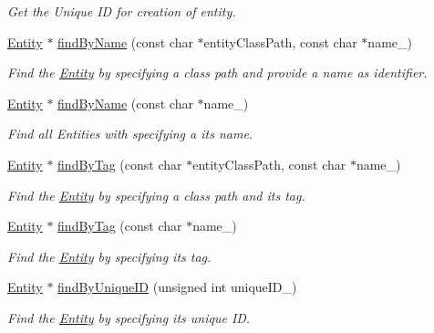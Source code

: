 \begin{DoxyCompactItemize}
\begin{DoxyCompactList}\small\item\em Get the Unique ID for creation of entity. \end{DoxyCompactList}\item 
\hyperlink{class_magnum_1_1_entity}{Entity} $\ast$ \hyperlink{class_magnum_1_1_entity_1_1_factory_a4fa2251befd88022de0971ba69566185}{find\+By\+Name} (const char $\ast$entity\+Class\+Path, const char $\ast$name\+\_\+)
\begin{DoxyCompactList}\small\item\em Find the \hyperlink{class_magnum_1_1_entity}{Entity} by specifying a class path and provide a name as identifier. \end{DoxyCompactList}\item 
\hyperlink{class_magnum_1_1_entity}{Entity} $\ast$ \hyperlink{class_magnum_1_1_entity_1_1_factory_a7b67defc2c3bd986ac0a56687c2ab934}{find\+By\+Name} (const char $\ast$name\+\_\+)
\begin{DoxyCompactList}\small\item\em Find all Entities with specifying a its name. \end{DoxyCompactList}\item 
\hyperlink{class_magnum_1_1_entity}{Entity} $\ast$ \hyperlink{class_magnum_1_1_entity_1_1_factory_a473713fa8f8d064bf8daa9be8b8fd7d3}{find\+By\+Tag} (const char $\ast$entity\+Class\+Path, const char $\ast$name\+\_\+)
\begin{DoxyCompactList}\small\item\em Find the \hyperlink{class_magnum_1_1_entity}{Entity} by specifying a class path and its tag. \end{DoxyCompactList}\item 
\hyperlink{class_magnum_1_1_entity}{Entity} $\ast$ \hyperlink{class_magnum_1_1_entity_1_1_factory_a9ed9e26f3be561cb1dc76db0333f7da2}{find\+By\+Tag} (const char $\ast$name\+\_\+)
\begin{DoxyCompactList}\small\item\em Find the \hyperlink{class_magnum_1_1_entity}{Entity} by specifying its tag. \end{DoxyCompactList}\item 
\hyperlink{class_magnum_1_1_entity}{Entity} $\ast$ \hyperlink{class_magnum_1_1_entity_1_1_factory_a0c4f0fb313889ee5537054d65b0bcdfb}{find\+By\+Unique\+ID} (unsigned int unique\+I\+D\+\_\+)
\begin{DoxyCompactList}\small\item\em Find the \hyperlink{class_magnum_1_1_entity}{Entity} by specifying its unique ID. \end{DoxyCompactList}\item 

\end{DoxyCompactItemize}
